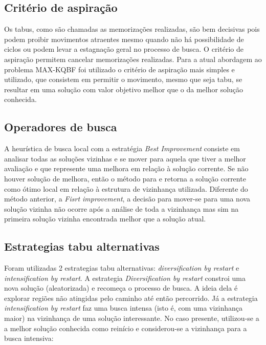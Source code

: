 \documentclass[brazilian,12pt]{article}
\begin{document}
\subsection{Critério de aspiração} 

    Os tabus, como são chamadas as memorizações realizadas, são bem decisivas pois podem proibir movimentos atraentes mesmo quando não há possibilidade de ciclos ou podem levar a estagnação geral no processo de busca. O critério de aspiração permitem cancelar memorizações realizadas. Para a atual abordagem ao problema MAX-KQBF foi utilizado o critério de aspiração mais simples e utilizado, que consistem em permitir o movimento, mesmo que seja tabu, se resultar em uma solução com valor objetivo melhor que o da melhor solução conhecida.

\subsection{Operadores de busca}

A heurística de busca local com a estratégia \textit{Best Improvement} consiste em analisar todas as soluções vizinhas e se mover para aquela que tiver a melhor avaliação e que represente uma melhora em relação à solução corrente. Se não houver solução de melhora, então o método para e retorna a solução corrente como ótimo local em relação à estrutura de vizinhança utilizada. Diferente do método anterior, a \textit{Fisrt improvement}, a decisão para mover-se para uma nova solução vizinha não ocorre após a análise de toda a vizinhança mas sim na primeira solução vizinha encontrada melhor que a solução atual.


\subsection{Estrategias tabu alternativas}
    Foram utilizadas 2 estrategias tabu alternativas: \textit{diversification by restart} e \textit{intensification by restart}.
    A estrategia \textit{Diversification by restart} constroi uma nova solução (aleatorizada) e recomeça o processo de busca. A ideia dela é explorar regiões não atingidas pelo caminho até então percorrido. Já a estrategia \textit{intensification by restart} faz uma busca intensa (isto é, com uma vizinhança maior) na vizinhança de uma solução interessante. No caso presente, utilizou-se a a melhor solução conhecida como reinício e considerou-se a vizinhança para a busca intensiva:
    
\end{document}
